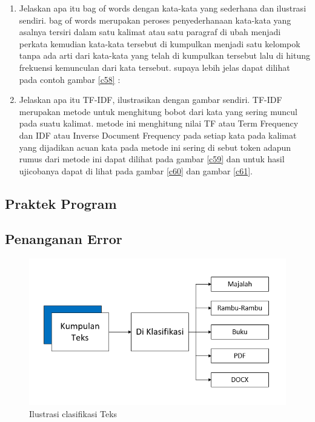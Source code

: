 \begin{enumerate}
\item Jelaskan apa itu bag of words dengan kata-kata yang sederhana dan ilustrasi sendiri.
 bag of words merupakan peroses penyederhanaan kata-kata yang asalnya tersiri dalam satu kalimat atau satu paragraf di ubah menjadi perkata kemudian kata-kata tersebut di kumpulkan menjadi satu kelompok tanpa ada arti dari kata-kata yang telah di kumpulkan tersebut lalu di hitung frekuensi kemunculan dari kata tersebut. supaya lebih jelas dapat dilihat pada contoh gambar \ref{c58} :

\item Jelaskan apa itu TF-IDF, ilustrasikan dengan gambar sendiri.
 TF-IDF merupakan metode untuk menghitung bobot dari kata yang sering muncul pada suatu kalimat. metode ini menghitung nilai TF atau Term Frequency dan IDF atau Inverse Document Frequency pada setiap kata pada kalimat yang dijadikan acuan kata pada metode ini sering di sebut token adapun rumus dari metode ini dapat dilihat pada gambar \ref{c59} dan untuk hasil ujicobanya dapat di lihat pada gambar \ref{c60} dan gambar \ref{c61}.

\end{enumerate}

\subsection{Praktek Program}

\subsection{Penanganan Error}

\begin{figure}
      \centerline{\includegraphics[width=1\textwidth]
      {figures/cokro/c55}}
      \caption{Ilustrasi clasifikasi Teks}
      \label{c55}
      \end{figure}

